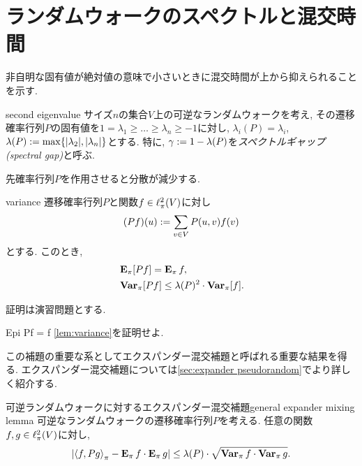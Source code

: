 \section{ランダムウォークのスペクトルと混交時間}
非自明な固有値が絶対値の意味で小さいときに混交時間が上から抑えられることを示す.
\begin{definition}{}{second eigenvalue}
    サイズ$n$の集合$V$上の可逆なランダムウォークを考え,
    その遷移確率行列$P$の固有値を$1=\lambda_1 \ge \dots \ge \lambda_n\ge -1$に対し,
    $\lambda_i(P)=\lambda_i$,
    $\lambda(P) \defeq \max\cbra{\abs{\lambda_2},\abs{\lambda_n}}$とする.
    特に, $\gamma\defeq 1-\lambda(P)$を\emph{スペクトルギャップ (spectral gap)}と呼ぶ.
\end{definition}
先確率行列$P$を作用させると分散が減少する.
\begin{lemma}{}{variance}
    遷移確率行列$P$と関数$f \in \pispace$に対し
    \[
        (Pf)(u) \defeq \sum_{v\in V} P(u,v)f(v)
    \]
    とする. このとき,
    \begin{align*}
         & \Epi[Pf] = \Epi f,                            \\
         & \Varpi[Pf] \le \lambda(P)^2 \cdot \Varpi [f].
    \end{align*}
\end{lemma}

証明は演習問題とする.
\begin{exercise}{}{Epi Pf = f}
    \cref{lem:variance}を証明せよ.
\end{exercise}
この補題の重要な系としてエクスパンダー混交補題と呼ばれる重要な結果を得る.
エクスパンダー混交補題については\cref{sec:expander pseudorandom}でより詳しく紹介する.
\begin{corollary}{可逆ランダムウォークに対するエクスパンダー混交補題}{general expander mixing lemma}
    可逆なランダムウォークの遷移確率行列$P$を考える.
    任意の関数$f,g\in\pispace$に対し,
    \begin{align*}
      \abs*{\piprod{f,Pg} - \Epi f \cdot \Epi g} \le \lambda(P)\cdot \sqrt{\Varpi f \cdot \Varpi g}.
    \end{align*}
\end{corollary}

